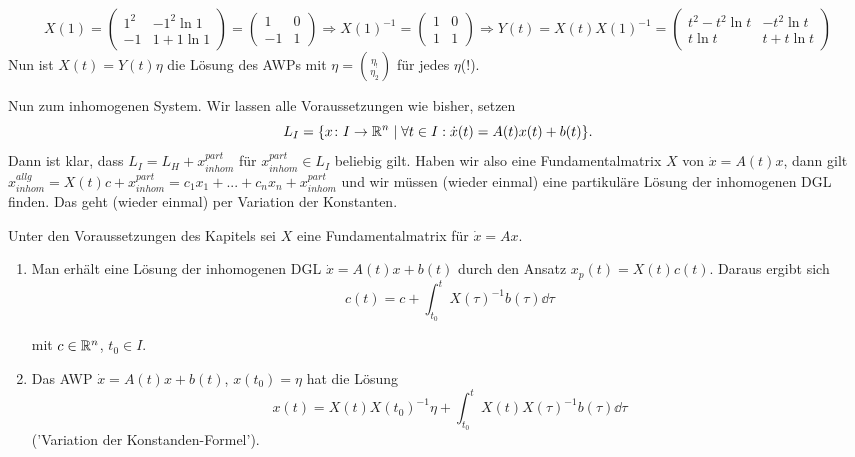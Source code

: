 \begin{beispiel}
	\[ X(1)=\begin{pmatrix}
	1^2&-1^2\ln 1\\-1&1+1\ln 1
	\end{pmatrix}=\begin{pmatrix}
	1&0\\-1&1
	\end{pmatrix}\Rightarrow X(1)^{-1}=\begin{pmatrix}
	1&0\\1&1
	\end{pmatrix}\Rightarrow Y(t)=X(t)X(1)^{-1}=\begin{pmatrix}
	t^2-t^2\ln t&-t^2\ln t\\t\ln t&t+t\ln t
	\end{pmatrix} \]
	Nun ist $ X(t)=Y(t)\eta $ die L\"osung des AWPs mit $ \eta=\binom{\eta_!}{\eta_2} $ f\"ur jedes $ \eta $(!).
\end{beispiel}
Nun zum inhomogenen System. Wir lassen alle Voraussetzungen wie bisher, setzen
\[ L_I=\lbrace x\colon I\rightarrow\mathbb{R}^n\mid\forall t\in I:\dot x(t)=A(t)x(t)+b(t)\rbrace. \]
Dann ist klar, dass $ L_I=L_H+x^{part}_{inhom} $ f\"ur  $ x_{inhom}^{part}\in L_I $ beliebig gilt. Haben wir also eine Fundamentalmatrix $ X $ von $ \dot x=A(t)x $, dann gilt $ x^{allg}_{inhom}=X(t)c+x_{inhom}^{part}=c_1x_1+...+c_nx_n+x_{inhom}^{part} $ und wir m\"ussen (wieder einmal) eine partikul\"are L\"osung der inhomogenen DGL finden. Das geht (wieder einmal) per Variation der Konstanten. 
\begin{satz}
	Unter den Voraussetzungen des Kapitels sei $ X $ eine Fundamentalmatrix f\"ur $ \dot x=Ax $.
	\begin{enumerate}
		\item Man erh\"alt eine L\"osung der inhomogenen DGL $ \dot x=A(t)x+b(t) $ durch den Ansatz $ x_p(t)=X(t)c(t) $. Daraus ergibt sich
		\[ c(t)=c+\int_{t_0}^t X(\tau)^{-1}b(\tau)\dd\tau \]
		
		mit $ c\in\mathbb{R}^n $, $ t_0\in I $.
		\item Das AWP $ \dot x=A(t)x+b(t) $, $ x(t_0)=\eta $ hat die L\"osung
		\[ x(t)=X(t)X(t_0)^{-1}\eta+\int_{t_0}^tX(t)X(\tau)^{-1}b(\tau)\dd\tau \]
		('Variation der Konstanden-Formel').
	\end{enumerate}
\end{satz}
